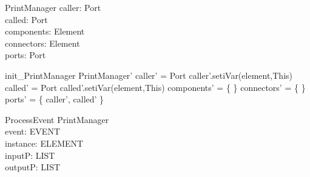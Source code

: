 \begin{schema}{PrintManager}
caller:  Port \\
called:  Port \\
components: \pset Element \\
connectors: \pset Element \\
ports: \pset Port
\end{schema}


\begin{zed}
init\_PrintManager \sdef \lsch PrintManager' 
                   \bbar caller' = \new Port
                   \land caller'.setiVar(element,This)
                   \land called' = \new Port
                   \land called'.setiVar(element,This)
                   \land components' = \{ \}
                   \land connectors' = \{ \}
                   \land ports' = \{ caller', called' \}  \rsch
                   \end{zed}


\begin{schema}{ProcessEvent}
\Delta PrintManager \\
event: EVENT \\
instance: ELEMENT \\
inputP: LIST \\
outputP: LIST
\end{schema}
